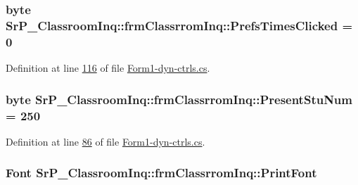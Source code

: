 \hypertarget{class_sr_p___classroom_inq_1_1frm_classrrom_inq_a649306fdbca853561ee4a6cac829315a}{
\subsubsection[{\-Prefs\-Times\-Clicked}]{\setlength{\rightskip}{0pt plus 5cm}byte {\bf \-Sr\-P\-\_\-\-Classroom\-Inq\-::frm\-Classrrom\-Inq\-::\-Prefs\-Times\-Clicked} = 0}}
\label{class_sr_p___classroom_inq_1_1frm_classrrom_inq_a649306fdbca853561ee4a6cac829315a}


\-Definition at line \hyperlink{_form1-dyn-ctrls_8cs_source_l00116}{116} of file \hyperlink{_form1-dyn-ctrls_8cs_source}{\-Form1-\/dyn-\/ctrls.\-cs}.

\hypertarget{class_sr_p___classroom_inq_1_1frm_classrrom_inq_ad5da56ffdb5d79486d9cf4eb7c3f44d4}{
\subsubsection[{\-Present\-Stu\-Num}]{\setlength{\rightskip}{0pt plus 5cm}byte {\bf \-Sr\-P\-\_\-\-Classroom\-Inq\-::frm\-Classrrom\-Inq\-::\-Present\-Stu\-Num} = 250}}
\label{class_sr_p___classroom_inq_1_1frm_classrrom_inq_ad5da56ffdb5d79486d9cf4eb7c3f44d4}


\-Definition at line \hyperlink{_form1-dyn-ctrls_8cs_source_l00086}{86} of file \hyperlink{_form1-dyn-ctrls_8cs_source}{\-Form1-\/dyn-\/ctrls.\-cs}.

\hypertarget{class_sr_p___classroom_inq_1_1frm_classrrom_inq_a314e4a61ea8458c5198273335dcf0b5f}{
\subsubsection[{\-Print\-Font}]{\setlength{\rightskip}{0pt plus 5cm}\-Font {\bf \-Sr\-P\-\_\-\-Classroom\-Inq\-::frm\-Classrrom\-Inq\-::\-Print\-Font}}}
\label{class_sr_p___classroom_inq_1_1frm_classrrom_inq_a314e4a61ea8458c5198273335dcf0b5f}


